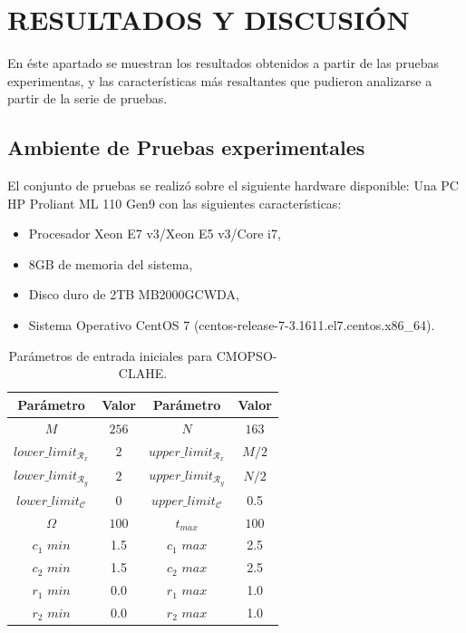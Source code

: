 \chapter{RESULTADOS Y DISCUSIÓN}
\label{sec:results_discussion}

En éste apartado se muestran los resultados obtenidos a partir de las pruebas experimentas, y las características más resaltantes que pudieron analizarse a partir de la serie de pruebas. 
\section{Ambiente de Pruebas experimentales}

El conjunto de pruebas se realizó sobre el siguiente hardware disponible: Una PC HP Proliant ML 110 Gen9 con las siguientes características:

\begin{itemize}
    \item Procesador Xeon E7 v3/Xeon E5 v3/Core i7,
    \item 8GB de memoria del sistema,
    \item Disco duro de 2TB MB2000GCWDA,
    \item Sistema Operativo CentOS 7 (centos-release-7-3.1611.el7.centos.x86\_64).
\end{itemize}

\begin{table}[H]
\setlength{\abovecaptionskip}{2pt plus 3pt minus 2pt} %
\caption[Parámetros de entrada para $MOPSO$]{Parámetros de entrada iniciales para CMOPSO-CLAHE.}
\begin{center}
 \begin{tabular}{||c c | c c||} 
 \hline
 Parámetro & Valor & Parámetro & Valor \\ [0.5ex] 
 \hline\hline
 $M$ & $256$ & $N$ & $163$ \\ 
 \hline
 $lower\_limit_{\mathscr{R}_x}$ & $2$ & $upper\_limit_{\mathscr{R}_x}$ & $M/2$ \\ 
 \hline
 $lower\_limit_{\mathscr{R}_y}$ & $2$ & $upper\_limit_{\mathscr{R}_y}$ & $N/2$ \\  
 \hline
 $lower\_limit_{{\mathscr{C}}}$ & $0$ & $upper\_limit_{{\mathscr{C}}}$ & 0.5 \\
\hline
$\Omega$ & $100$ & $t_{max}$ & $100$ \\ 
\hline
$c_1$ $min$ & 1.5 & $c_1$ $max$ & 2.5 \\ 
\hline
$c_2$ $min$ & 1.5 & $c_2$ $max$ & 2.5 \\ 
\hline
$r_1$ $min$ & 0.0 & $r_1$ $max$ & 1.0 \\ 
\hline
$r_2$ $min$ & 0.0 & $r_2$ $max$ & 1.0 \\
\hline
\end{tabular}
\end{center}
\label{table:parametrospso}
\end{table}

